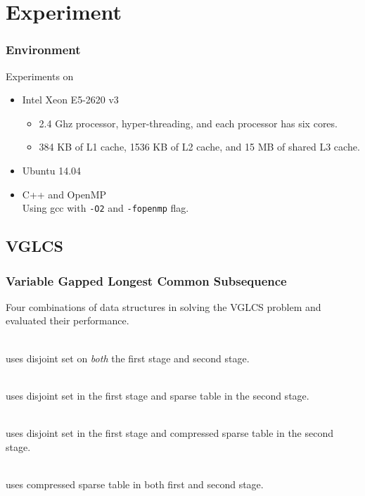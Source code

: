 \section{Experiment}

\begin{frame}
	\frametitle{Environment}
	Experiments on 
	\begin{itemize}
		\setlength\itemsep{1em}
		\item
			Intel Xeon E5-2620 v3
			\begin{itemize}
				\setlength\itemsep{1em}
				\item
					2.4 Ghz processor, hyper-threading, and each
					processor has six cores.
				\item
					384 KB of L1 cache, 1536 KB of L2 cache, and 15 MB
					of shared L3 cache.
			\end{itemize}
		\item 
			Ubuntu 14.04
		\item
			C++ and OpenMP \\
			Using gcc with {\tt -O2} and {\tt -fopenmp} flag.
	\end{itemize}
\end{frame}

\subsection{VGLCS}
\begin{frame}
    \frametitle{Variable Gapped Longest Common Subsequence}
	Four combinations of data structures in solving the VGLCS problem
	and evaluated their performance.

	\begin{description}
		\setlength\itemsep{1em}
		\item[Peng's algorithm] \hfill \\
			uses disjoint set on {\em both} the first stage and second stage.
		\item[{\sc Para-ST-DS}] \hfill \\
			uses disjoint set in the first stage and sparse table in the
			second stage.
		\item[{\sc Para-CoST-DS}] \hfill \\
			uses disjoint set in the first stage and compressed sparse
			table in the second stage.
		\item[{\sc Para-CoST}] \hfill \\
			uses compressed sparse table in both first and second stage.
	\end{description}
\end{frame}

